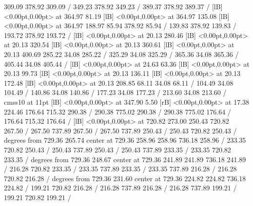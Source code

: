 {\setsolid
{} 309.09 378.92 309.09 /
\setsolid
{} 349.23 378.92 349.23 /
\setsolid
{} 389.37 378.92 389.37 /
  [lB] <0.00pt,0.00pt> at 364.97 81.19
  [lB] <0.00pt,0.00pt> at 364.97 135.08
  [lB] <0.00pt,0.00pt> at 364.97 188.97
\setsolid
{} 85.94 378.92 85.94 /
\setsolid
{} 139.83 378.92 139.83 /
\setsolid
{} 193.72 378.92 193.72 /
  [lB] <0.00pt,0.00pt> at 20.13 280.46
  [lB] <0.00pt,0.00pt> at 20.13 320.54
  [lB] <0.00pt,0.00pt> at 20.13 360.61
  [lB] <0.00pt,0.00pt> at 20.13 400.69
\setsolid
{} 285.22 34.08 285.22 /
\setsolid
{} 325.29 34.08 325.29 /
\setsolid
{} 365.36 34.08 365.36 /
\setsolid
{} 405.44 34.08 405.44 /
  [lB] <0.00pt,0.00pt> at 24.63 63.36
  [lB] <0.00pt,0.00pt> at 20.13 99.73
  [lB] <0.00pt,0.00pt> at 20.13 136.11
  [lB] <0.00pt,0.00pt> at 20.13 172.48
  [lB] <0.00pt,0.00pt> at 20.13 208.85
\setsolid
{} 68.11 34.08 68.11 /
\setsolid
{} 104.49 34.08 104.49 /
\setsolid
{} 140.86 34.08 140.86 /
\setsolid
{} 177.23 34.08 177.23 /
\setsolid
{} 213.60 34.08 213.60 /
\font\picfont cmss10 at 11pt\picfont
{}  [lB] <0.00pt,0.00pt> at 347.90 5.50
 [rB] <0.00pt,0.00pt> at 17.38 224.46
\setsolid
{} 176.64 715.32 290.38 /
 290.38 775.02 290.38 /
 290.38 775.02 176.64 /
 176.64 715.32 176.64 /
  [lB] <0.00pt,0.00pt> at 720.82 273.00
\setsolid
{} 250.43 720.82 267.50 /
 267.50 737.89 267.50 /
 267.50 737.89 250.43 /
 250.43 720.82 250.43 /
 degrees from 729.36 265.74 center at 729.36 258.96
\setdashpattern <4pt, 4pt>
 258.96 736.18 258.96 /
\setsolid
{} 233.35 720.82 250.43 /
 250.43 737.89 250.43 /
 250.43 737.89 233.35 /
 233.35 720.82 233.35 /
 degrees from 729.36 248.67 center at 729.36 241.89
\setdashpattern <4pt, 4pt>
 241.89 736.18 241.89 /
\setsolid
{} 216.28 720.82 233.35 /
 233.35 737.89 233.35 /
 233.35 737.89 216.28 /
 216.28 720.82 216.28 /
 degrees from 729.36 231.60 center at 729.36 224.82
\setdashpattern <4pt, 4pt>
 224.82 736.18 224.82 /
\setsolid
{} 199.21 720.82 216.28 /
 216.28 737.89 216.28 /
 216.28 737.89 199.21 /
 199.21 720.82 199.21 /
}
